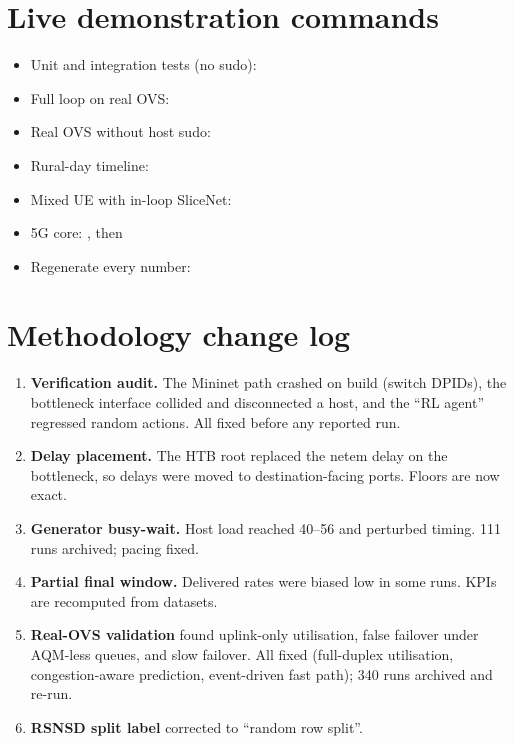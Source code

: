 \section{Live demonstration commands}
\begin{itemize}
\item Unit and integration tests (no sudo): 
\item Full loop on real OVS: 
\item Real OVS without host sudo: 
\item Rural-day timeline: 
\item Mixed UE with in-loop SliceNet: 
\item 5G core: , then 
\item Regenerate every number: 
\end{itemize}

\section{Methodology change log}
{\small
\begin{enumerate}[leftmargin=1.4em]
\item \textbf{Verification audit.} The Mininet path crashed on build (switch DPIDs), the bottleneck interface collided and
disconnected a host, and the ``RL agent'' regressed random actions. All fixed before any reported run.
\item \textbf{Delay placement.} The HTB root replaced the netem delay on the bottleneck, so delays were moved to
destination-facing ports. Floors are now exact.
\item \textbf{Generator busy-wait.} Host load reached 40--56 and perturbed timing. 111 runs archived; pacing fixed.
\item \textbf{Partial final window.} Delivered rates were biased low in some runs. KPIs are recomputed from datasets.
\item \textbf{Real-OVS validation} found uplink-only utilisation, false failover under AQM-less queues, and slow failover.
All fixed (full-duplex utilisation, congestion-aware prediction, event-driven fast path); 340 runs archived and re-run.
\item \textbf{RSNSD split label} corrected to ``random row split''.
\end{enumerate}}

